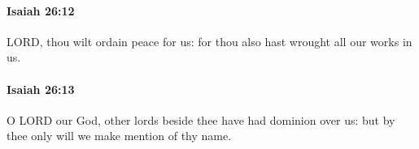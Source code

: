 		\paragraph{Isaiah 26:12} %
			\label{ISAIAH-26-12}

			LORD, thou wilt ordain peace for us: for thou also hast wrought all our works in us.


		\paragraph{Isaiah 26:13} %
			\label{ISAIAH-26-13}

			O LORD our God, other lords beside thee have had dominion over us: but by thee only will we make mention of thy name.


